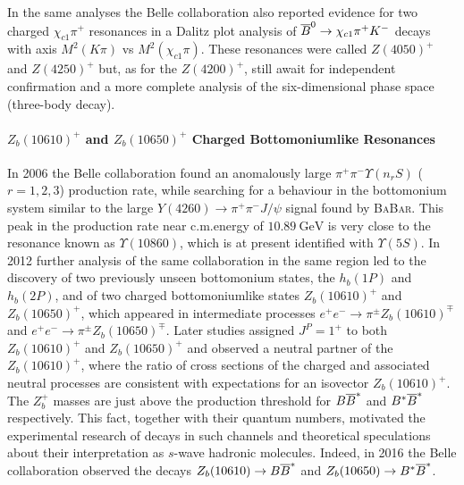 In the same analyses the Belle collaboration also reported evidence for two charged $\chi_{c1} \pi^+$ resonances in a Dalitz plot analysis of $\overline{B}^0 \to \chi_{c1} \pi^+ K^-$ decays with axis $M^2(K \pi)$ vs $M^2(\chi_{c1} \pi)$. These resonances were called $Z(4050)^+$ and $Z(4250)^+$ but, as for the $Z(4200)^+$, still await for independent confirmation and a more complete analysis of the six-dimensional phase space (three-body decay).

\paragraph{$Z_b(10610)^+$ and $Z_b(10650)^+$ Charged Bottomoniumlike Resonances} In 2006 the Belle collaboration found an anomalously large $\pi^+ \pi^- \varUpsilon(n_r S)$ ($r = 1,2, 3$) production rate, while searching for a behaviour in the bottomonium system similar to the large $Y(4260) \to \pi^+ \pi^- J/\psi$ signal found by \textsc{BaBar}. This peak in the production rate near c.m.\@ energy of $10.89 \ \text{GeV}$ is very close to the resonance known as $\varUpsilon(10860)$, which is at present identified with $\varUpsilon(5 S)$. In 2012 further analysis of the same collaboration in the same region led to the discovery of two previously unseen bottomonium states, the $h_b(1P)$ and $h_b(2P)$, and of two charged bottomoniumlike states $Z_b(10610)^+$ and $Z_b(10650)^+$, which appeared in intermediate processes $e^+ e^- \to \pi^\pm Z_b(10610)^\mp$ and $e^+ e^- \to \pi^\pm Z_b(10650)^\mp$. Later studies assigned $J^P = 1^+$ to both $Z_b(10610)^+$ and $Z_b(10650)^+$ and observed a neutral partner of the $Z_b(10610)^+$, where the ratio of cross sections of the charged and associated neutral processes are consistent with expectations for an isovector $Z_b(10610)^+$. The $Z_b^+$ masses are just above the production threshold for $B \overline{B}^*$ and $B^* \overline{B}^*$ respectively. This fact, together with their quantum numbers, motivated the experimental research of decays in such channels and theoretical speculations about their interpretation as $s$-wave hadronic molecules. Indeed, in 2016 the Belle collaboration observed the decays $Z_b(10610) \to B \overline{B}^*$ and $Z_b(10650) \to B^* \overline{B}^*$.

